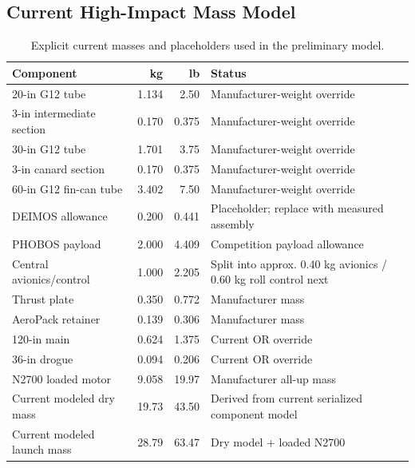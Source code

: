 \documentclass[10pt]{article}
\begin{document}
\subsection{Current High-Impact Mass Model}
\begin{table}[ht]
\centering
\caption{Explicit current masses and placeholders used in the preliminary model.}
\begin{tabularx}{\linewidth}{@{}XrrX@{}}
\toprule
\textbf{Component} & \textbf{kg} & \textbf{lb} & \textbf{Status} \\
\midrule
20-in G12 tube & 1.134 & 2.50 & Manufacturer-weight override \\
3-in intermediate section & 0.170 & 0.375 & Manufacturer-weight override \\
30-in G12 tube & 1.701 & 3.75 & Manufacturer-weight override \\
3-in canard section & 0.170 & 0.375 & Manufacturer-weight override \\
60-in G12 fin-can tube & 3.402 & 7.50 & Manufacturer-weight override \\
DEIMOS allowance & 0.200 & 0.441 & Placeholder; replace with measured assembly \\
PHOBOS payload & 2.000 & 4.409 & Competition payload allowance \\
Central avionics/control & 1.000 & 2.205 & Split into approx. 0.40 kg avionics / 0.60 kg roll control next \\
Thrust plate & 0.350 & 0.772 & Manufacturer mass \\
AeroPack retainer & 0.139 & 0.306 & Manufacturer mass \\
120-in main & 0.624 & 1.375 & Current OR override \\
36-in drogue & 0.094 & 0.206 & Current OR override \\
N2700 loaded motor & 9.058 & 19.97 & Manufacturer all-up mass \\
\midrule
Current modeled dry mass & 19.73 & 43.50 & Derived from current serialized component model \\
Current modeled launch mass & 28.79 & 63.47 & Dry model + loaded N2700 \\
\bottomrule
\end{tabularx}
\end{table}
\end{document}

